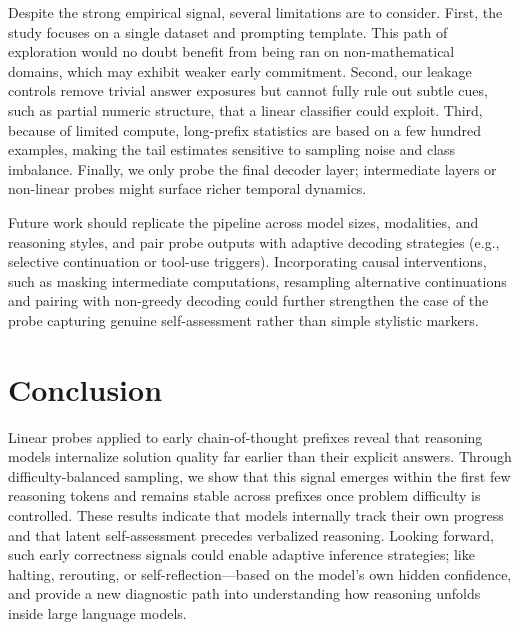 \documentclass[10pt,a4paper,twocolumn]{article}
\begin{document}
Despite the strong empirical signal, several limitations are to consider. First, the study focuses on a single dataset and prompting template. This path of exploration would no doubt benefit from being ran on non-mathematical domains, which may exhibit weaker early commitment. Second, our leakage controls remove trivial answer exposures but cannot fully rule out subtle cues, such as partial numeric structure, that a linear classifier could exploit. Third, because of limited compute, long-prefix statistics are based on a few hundred examples, making the tail estimates sensitive to sampling noise and class imbalance. Finally, we only probe the final decoder layer; intermediate layers or non-linear probes might surface richer temporal dynamics.

Future work should replicate the pipeline across model sizes, modalities, and reasoning styles, and pair probe outputs with adaptive decoding strategies (e.g., selective continuation or tool-use triggers). Incorporating causal interventions, such as masking intermediate computations, resampling alternative continuations and pairing with non-greedy decoding could further strengthen the case of the probe capturing genuine self-assessment rather than simple stylistic markers.

\section{Conclusion}

\label{sec:conclusion}
Linear probes applied to early chain-of-thought prefixes reveal that reasoning models internalize solution quality far earlier than their explicit answers. Through difficulty-balanced sampling, we show that this signal emerges within the first few reasoning tokens and remains stable across prefixes once problem difficulty is controlled. These results indicate that models internally track their own progress and that latent self-assessment precedes verbalized reasoning. Looking forward, such early correctness signals could enable adaptive inference strategies; like halting, rerouting, or self-reflection—based on the model’s own hidden confidence, and provide a new diagnostic path into understanding how reasoning unfolds inside large language models.
\end{document}
